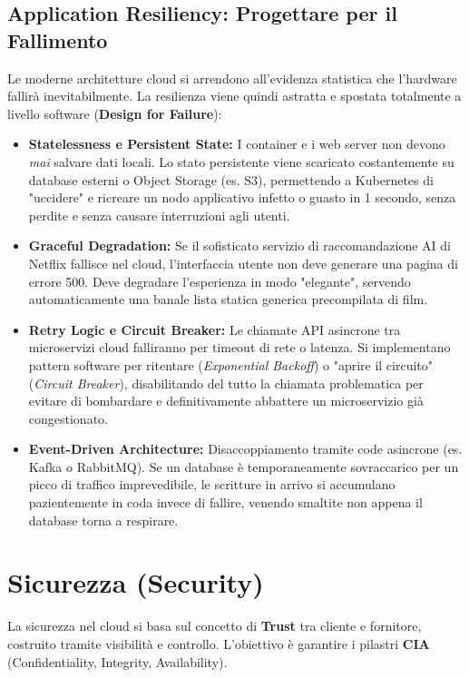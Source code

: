 \subsection{Application Resiliency: Progettare per il Fallimento}
Le moderne architetture cloud si arrendono all'evidenza statistica che l'hardware fallirà inevitabilmente. La resilienza viene quindi astratta e spostata totalmente a livello software (\textbf{Design for Failure}):
\begin{itemize}
    \item \textbf{Statelessness e Persistent State:} I container e i web server non devono \textit{mai} salvare dati locali. Lo stato persistente viene scaricato costantemente su database esterni o Object Storage (es. S3), permettendo a Kubernetes di "uccidere" e ricreare un nodo applicativo infetto o guasto in 1 secondo, senza perdite e senza causare interruzioni agli utenti.
    \item \textbf{Graceful Degradation:} Se il sofisticato servizio di raccomandazione AI di Netflix fallisce nel cloud, l'interfaccia utente non deve generare una pagina di errore 500. Deve degradare l'esperienza in modo "elegante", servendo automaticamente una banale lista statica generica precompilata di film.
    \item \textbf{Retry Logic e Circuit Breaker:} Le chiamate API asincrone tra microservizi cloud falliranno per timeout di rete o latenza. Si implementano pattern software per ritentare (\textit{Exponential Backoff}) o "aprire il circuito" (\textit{Circuit Breaker}), disabilitando del tutto la chiamata problematica per evitare di bombardare e definitivamente abbattere un microservizio già congestionato.
    \item \textbf{Event-Driven Architecture:} Disaccoppiamento tramite code asincrone (es. Kafka o RabbitMQ). Se un database è temporaneamente sovraccarico per un picco di traffico imprevedibile, le scritture in arrivo si accumulano pazientemente in coda invece di fallire, venendo smaltite non appena il database torna a respirare.
\end{itemize}

\section{Sicurezza (Security)}
La sicurezza nel cloud si basa sul concetto di \textbf{Trust} tra cliente e fornitore, costruito tramite visibilità e controllo. L'obiettivo è garantire i pilastri \textbf{CIA} (Confidentiality, Integrity, Availability).

